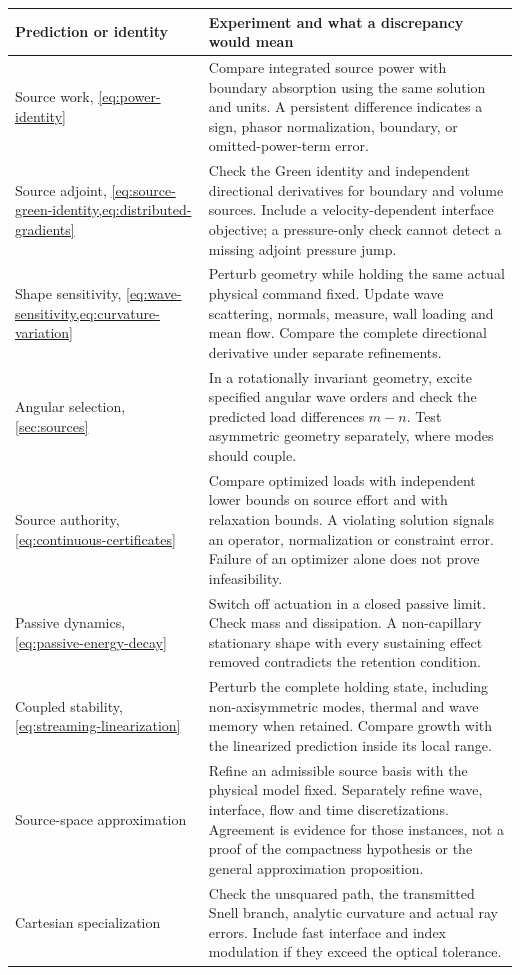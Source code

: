 \begin{longtable}{@{}p{36mm}p{108mm}@{}}
\toprule Prediction or identity & Experiment and what a discrepancy would mean
\\\midrule\endhead
Source work, \cref{eq:power-identity} & Compare integrated source power with
boundary absorption using the same solution and units. A persistent difference
indicates a sign, phasor normalization, boundary, or omitted-power-term error.\\
Source adjoint, \cref{eq:source-green-identity,eq:distributed-gradients} &
Check the Green identity and independent directional derivatives for boundary
and volume sources. Include a velocity-dependent interface objective; a
pressure-only check cannot detect a missing adjoint pressure jump.\\
Shape sensitivity, \cref{eq:wave-sensitivity,eq:curvature-variation} &
Perturb geometry while holding the same actual physical command fixed. Update
wave scattering, normals, measure, wall loading and mean flow. Compare the
complete directional derivative under separate refinements.\\
Angular selection, \cref{sec:sources} & In a rotationally invariant geometry,
excite specified angular wave orders and check the predicted load differences
$m-n$. Test asymmetric geometry separately, where modes should couple.\\
Source authority, \cref{eq:continuous-certificates} & Compare optimized loads
with independent lower bounds on source effort and with relaxation bounds.
A violating solution signals an operator, normalization or constraint error.
Failure of an optimizer alone does not prove infeasibility.\\
Passive dynamics, \cref{eq:passive-energy-decay} & Switch off actuation in a
closed passive limit. Check mass and dissipation. A non-capillary stationary
shape with every sustaining effect removed contradicts the retention condition.\\
Coupled stability, \cref{eq:streaming-linearization} & Perturb the complete
holding state, including non-axisymmetric modes, thermal and wave memory when
retained. Compare growth with the linearized prediction inside its local range.\\
Source-space approximation & Refine an admissible source basis with the physical
model fixed. Separately refine wave, interface, flow and time discretizations.
Agreement is evidence for those instances, not a proof of the compactness
hypothesis or the general approximation proposition.\\
Cartesian specialization & Check the unsquared path, the transmitted Snell
branch, analytic curvature and actual ray errors. Include fast interface and
index modulation if they exceed the optical tolerance.\\
\bottomrule
\end{longtable}

